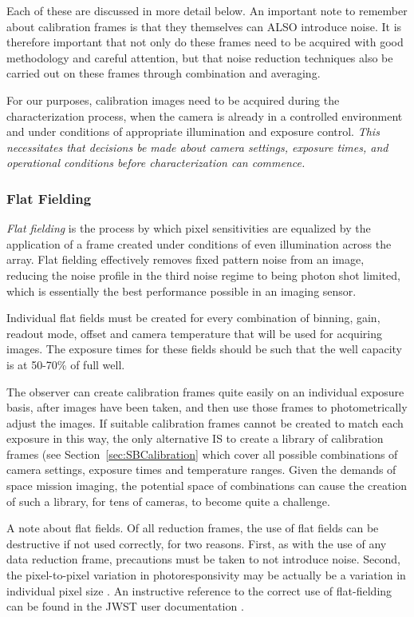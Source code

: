 \documentclass[10pt]{article}
\begin{document}
Each of these are discussed in more detail below. An important note to remember about calibration frames is that they themselves can ALSO introduce noise. It is therefore important that not only do these frames need to be acquired with good methodology and careful attention, but that noise reduction techniques also be carried out on these frames through combination and averaging. 

For our purposes, calibration images need to be acquired during the characterization process, when the camera is already in a controlled environment and under conditions of appropriate illumination and exposure control. \emph{This necessitates that decisions be made about camera settings, exposure times, and operational conditions before characterization can commence.} 

\subsubsection{Flat Fielding}

\emph{Flat fielding} is the process by which pixel sensitivities are equalized by the application of a frame created under conditions of even illumination across the array. Flat fielding effectively removes fixed pattern noise from an image, reducing the noise profile in the third noise regime to being photon shot limited, which is essentially the best performance possible in an imaging sensor. 

Individual flat fields must be created for every combination of binning, gain, readout mode, offset and camera temperature that will be used for acquiring images. The exposure times for these fields should be such that the well capacity is at 50-70\% of full well. 

The observer can create calibration frames quite easily on an individual exposure basis, after images have been taken, and then use those frames to photometrically adjust the images. 
If suitable calibration frames cannot be created to match each exposure in this way, the only alternative IS to create a library of calibration frames (see Section~\ref{sec:SBCalibration} which cover all possible combinations of camera settings, exposure times and temperature ranges. Given the demands of space mission imaging, the potential space of combinations can cause the creation of such a library, for tens of cameras, to become quite a challenge.

A note about flat fields. Of all reduction frames, the use of flat fields can be destructive if not used correctly, for two reasons. First, as with the use of any data reduction frame, precautions must be taken to not introduce noise. Second, the pixel-to-pixel variation in photoresponsivity may be actually be a variation in individual pixel size \cite{ingraham24}. An instructive reference to the correct use of flat-fielding can be found in the JWST user documentation \cite{website:jwst23}.
\end{document}
